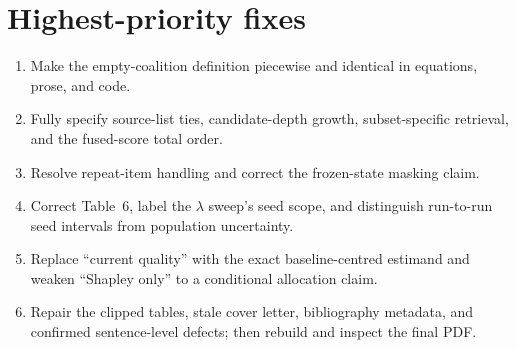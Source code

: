 \documentclass[11pt]{article}
\begin{document}
\section*{Highest-priority fixes}

\begin{enumerate}
\item Make the empty-coalition definition piecewise and identical in equations, prose, and code.
\item Fully specify source-list ties, candidate-depth growth, subset-specific retrieval, and the fused-score total order.
\item Resolve repeat-item handling and correct the frozen-state masking claim.
\item Correct Table~6, label the $\lambda$ sweep's seed scope, and distinguish run-to-run seed intervals from population uncertainty.
\item Replace ``current quality'' with the exact baseline-centred estimand and weaken ``Shapley only'' to a conditional allocation claim.
\item Repair the clipped tables, stale cover letter, bibliography metadata, and confirmed sentence-level defects; then rebuild and inspect the final PDF.
\end{enumerate}
\end{document}
